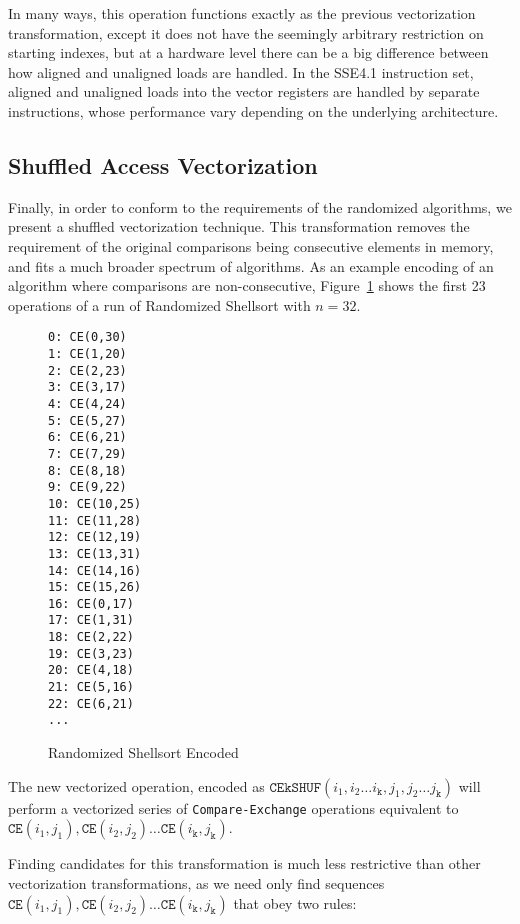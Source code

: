 In many ways, this operation functions exactly as the previous vectorization transformation, except it does not have the seemingly arbitrary restriction on starting indexes, but at a hardware level there can be a big difference between how aligned and unaligned loads are handled. In the SSE4.1 instruction set, aligned and unaligned loads into the vector registers are handled by separate instructions, whose performance vary depending on the underlying architecture.

\subsection{Shuffled Access Vectorization}

Finally, in order to conform to the requirements of the randomized algorithms, we present a shuffled vectorization technique. This transformation removes the requirement of the original comparisons being consecutive elements in memory, and fits a much broader spectrum of algorithms. As an example encoding of an algorithm where comparisons are non-consecutive, Figure~\ref{fig:RandShellCE} shows the first 23 operations of a run of Randomized Shellsort with $n=32$.

\begin{figure}
\begin{multicols}{3}
\begin{verbatim}
0: CE(0,30)
1: CE(1,20)
2: CE(2,23)
3: CE(3,17)
4: CE(4,24)
5: CE(5,27)
6: CE(6,21)
7: CE(7,29)
8: CE(8,18)
9: CE(9,22)
10: CE(10,25)
11: CE(11,28)
12: CE(12,19)
13: CE(13,31)
14: CE(14,16)
15: CE(15,26)
16: CE(0,17)
17: CE(1,31)
18: CE(2,22)
19: CE(3,23)
20: CE(4,18)
21: CE(5,16)
22: CE(6,21)
...
\end{verbatim}
\end{multicols}
\caption{Randomized Shellsort Encoded}
\label{fig:RandShellCE}
\end{figure}

The new vectorized operation, encoded as $\mathtt{CEkSHUF}(i_1, i_2 \dots i_\mathtt{k},j_1, j_2 \dots j_\mathtt{k})$ will perform a vectorized series of \texttt{Compare-Exchange} operations equivalent to $\mathtt{CE}(i_1,j_1), \mathtt{CE}(i_2, j_2) \dots \mathtt{CE}(i_\mathtt{k}, j_\mathtt{k})$.

Finding candidates for this transformation is much less restrictive than other vectorization transformations, as we need only find sequences  $\mathtt{CE}(i_1, j_1), \mathtt{CE}(i_2, j_2) \dots \mathtt{CE}(i_\mathtt{k}, j_\mathtt{k})$ that obey two rules:


